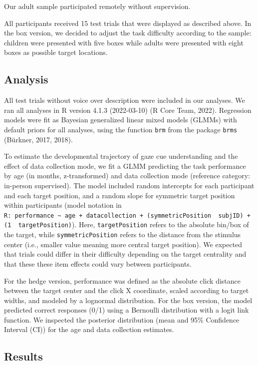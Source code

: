\documentclass[
  man,floatsintext]{apa6}
\begin{document}
Our adult sample participated remotely without supervision.

All participants received 15 test trials that were displayed as described above. In the box version, we decided to adjust the task difficulty according to the sample: children were presented with five boxes while adults were presented with eight boxes as possible target locations.

\hypertarget{analysis}{%
\subsection{Analysis}\label{analysis}}

All test trials without voice over description were included in our analyses.
We ran all analyses in R version 4.1.3 (2022-03-10) (R Core Team, 2022).
Regression models were fit as Bayesian generalized linear mixed models (GLMMs) with default priors for all analyses, using the function \texttt{brm} from the package \texttt{brms} (Bürkner, 2017, 2018).

To estimate the developmental trajectory of gaze cue understanding and the effect of data collection mode, we fit a GLMM predicting the task performance by age (in months, z-transformed) and data collection mode (reference category: in-person supervised). The model included random intercepts for each participant and each target position, and a random slope for symmetric target position within participants (model notation in \texttt{R:\ performance\ \textasciitilde{}\ age\ +\ datacollection\ +\ (symmetricPosition\ \textbar{}\ subjID)\ +\ (1\ \textbar{}\ targetPosition)}). Here, \texttt{targetPosition} refers to the absolute bin/box of the target, while \texttt{symmetricPosition} refers to the distance from the stimulus center (i.e., smaller value meaning more central target position). We expected that trials could differ in their difficulty depending on the target centrality and that these these item effects could vary between participants.

For the hedge version, performance was defined as the absolute click distance between the target center and the click X coordinate, scaled according to target widths, and modeled by a lognormal distribution.
For the box version, the model predicted correct responses (0/1) using a Bernoulli distribution with a logit link function.
We inspected the posterior distribution (mean and 95\% Confidence Interval (CI)) for the age and data collection estimates.

\hypertarget{results}{%
\subsection{Results}\label{results}}
\end{document}
